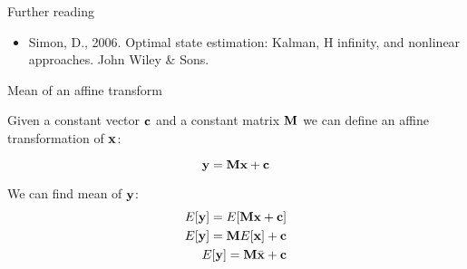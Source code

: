 \documentclass{beamer}
\begin{document}
\begin{frame}{Further reading}
	\begin{flushleft}
		
		\begin{itemize}
			\item Simon, D., 2006. Optimal state estimation: Kalman, H infinity, and nonlinear approaches. John Wiley \& Sons.
		\end{itemize}
		
	\end{flushleft}
\end{frame}


\myqrframe



\begin{frame}
	\begin{flushleft}
		
		
	\end{flushleft}
\end{frame}

\begin{frame}{Mean of an affine transform}
	\begin{flushleft}
		
		Given a constant vector $\mathbf{c}$ and a constant matrix $\mathbf{M}$ we can define an affine transformation of $\mathbf{x}$:
		
		\begin{equation}
			\mathbf{y} = \mathbf{M}\mathbf{x} + \mathbf{c}
		\end{equation}
		
		We can find mean of $\mathbf{y}$:
		\begin{align}
			E[\mathbf{y}] = E[\mathbf{M}\mathbf{x} + \mathbf{c}] \\
			E[\mathbf{y}] = \mathbf{M}E[\mathbf{x}] + \mathbf{c} \\
			E[\mathbf{y}] = \mathbf{M}\bar{\mathbf{x}} + \mathbf{c}
		\end{align}
		
		
	\end{flushleft}
\end{frame}
\end{document}
